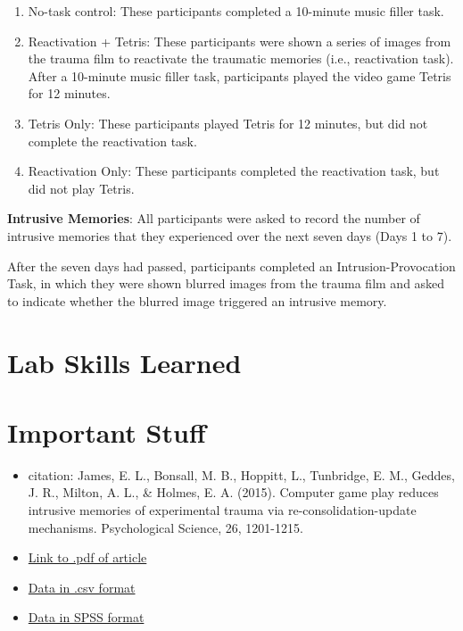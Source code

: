 \documentclass[]{book}
\providecommand{\tightlist}{%
  \setlength{\itemsep}{0pt}\setlength{\parskip}{0pt}}
\theoremstyle{definition}
\theoremstyle{definition}
\theoremstyle{definition}
\theoremstyle{remark}
\begin{document}
\begin{enumerate}
\def\labelenumi{\arabic{enumi}.}
\tightlist
\item
  No-task control: These participants completed a 10-minute music filler
  task.
\item
  Reactivation + Tetris: These participants were shown a series of
  images from the trauma film to reactivate the traumatic memories
  (i.e., reactivation task). After a 10-minute music filler task,
  participants played the video game Tetris for 12 minutes.
\item
  Tetris Only: These participants played Tetris for 12 minutes, but did
  not complete the reactivation task.
\item
  Reactivation Only: These participants completed the reactivation task,
  but did not play Tetris.
\end{enumerate}

\textbf{Intrusive Memories}: All participants were asked to record the
number of intrusive memories that they experienced over the next seven
days (Days 1 to 7).

After the seven days had passed, participants completed an
Intrusion-Provocation Task, in which they were shown blurred images from
the trauma film and asked to indicate whether the blurred image
triggered an intrusive memory.

\section{Lab Skills Learned}\label{lab-skills-learned-2}

\section{Important Stuff}\label{important-stuff-2}

\begin{itemize}
\tightlist
\item
  citation: James, E. L., Bonsall, M. B., Hoppitt, L., Tunbridge, E. M.,
  Geddes, J. R., Milton, A. L., \& Holmes, E. A. (2015). Computer game
  play reduces intrusive memories of experimental trauma via
  re-consolidation-update mechanisms. Psychological Science, 26,
  1201-1215.
\item
  \href{http://journals.sagepub.com/stoken/default+domain/hQ2W4fbPrZVJ7eyNJaqu/full}{Link
  to .pdf of article}
\item
  \href{https://raw.githubusercontent.com/CrumpLab/statisticsLab/master/data/Jamesetal2015Experiment2.csv}{Data
  in .csv format}
\item
  \href{https://drive.google.com/file/d/0Bz-rhZ21ShvOZ1lvQ0dQekZGWU0/view?usp=sharing}{Data
  in SPSS format}
\end{itemize}
\end{document}
